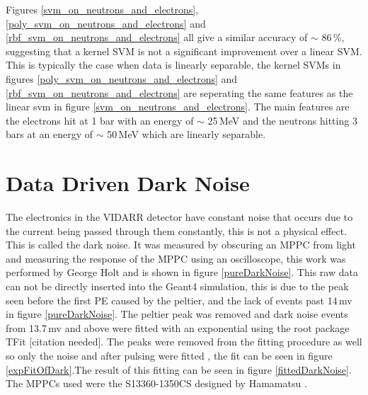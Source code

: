 \documentclass[12pt,a4paper]{article}
\begin{document}
Figures \ref{svm_on_neutrons_and_electrons}, \ref{poly_svm_on_neutrons_and_electrons} and \ref{rbf_svm_on_neutrons_and_electrons} all give a similar accuracy of $\sim$ 86\,\%, suggesting that a kernel SVM is not a significant improvement over a linear SVM. This is typically the case when data is linearly separable, the kernel SVMs in figures \ref{poly_svm_on_neutrons_and_electrons} and \ref{rbf_svm_on_neutrons_and_electrons} are seperating the same features as the linear svm in figure \ref{svm_on_neutrons_and_electrons}. The main features are the electrons hit at 1 bar with an energy of $\sim$ 25\,MeV and the neutrons hitting 3 bars at an energy of $\sim$ 50\,MeV which are linearly separable. 

\section{Data Driven Dark Noise} %
The electronics in the VIDARR detector have constant noise that occurs due to the current being passed through them constantly, this is not a physical effect. This is called the dark noise. It was measured by obscuring an MPPC from light and measuring the response of the MPPC using an oscilloscope, this work was performed by George Holt and is shown in figure \ref{pureDarkNoise}. This raw data can not be directly inserted into the Geant4 simulation, this is due to the peak seen before the first PE caused by the peltier, and the lack of events past 14\,mv in figure \ref{pureDarkNoise}. The peltier peak was removed and dark noise events from 13.7\,mv and above were fitted with an exponential using the root package TFit [citation needed]. The peaks were removed from the fitting procedure as well so only the noise and after pulsing were fitted , the fit can be seen in figure \ref{expFitOfDark}.The result of this fitting can be seen in figure \ref{fittedDarkNoise}. The MPPCs used were the S13360-1350CS designed by Hamamatsu \cite{hamamatsu_mppc_spec}.
\end{document}
